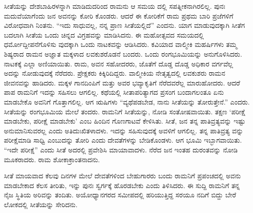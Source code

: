 ಸೀತೆಯನ್ನು ದೇಶಬಾಹಿರಳನ್ನಾಗಿ ಮಾಡಿದುದರಿಂದ ರಾಮನು ಆ ಸಮಯ ದಲ್ಲಿ ಸಪತ್ನೀಕನಾಗಿರಲಿಲ್ಲ. ಪುನಃ ಮದುವೆಯಾಗೆಂದು ಜನ ಅವನನ್ನು ಕೋರಿ ಕೊಂಡರು. ಆದರೆ ಈ ಕೋರಿಕೆಗೆ ರಾಮ ಪ್ರಥಮ ಬಾರಿ ಪ್ರಜೆಗಳಿಗೆ ವಿರೋಧವಾಗಿ ನಿಂತನು. “ಇದು ಸಾಧುವಲ್ಲ, ನನ್ನ ಪ್ರಾಣ ಸೀತೆಯಲ್ಲಿದೆ” ಎಂದನು. ಯಾಗ ಮಾಡುವುದಕ್ಕಾಗಿ ಸೀತೆಗ ಬದಲಾಗಿ ಸೀತೆಯ ಒಂದು ಚಿನ್ನದ ವಿಗ್ರಹವನ್ನು ಮಾಡಿಸಿದನು. ಈ ಮಹೋತ್ಸವದ ಸಮಯದಲ್ಲಿ ಧರ್ಮೋದ್ದೀಪನೆಗೊಳಿಸು ವುದಕ್ಕಾಗಿ ಒಂದು ನಾಟಕವನ್ನು ಆಡಿಸಿದರು. ಕವಿಯಾದ ವಾಲ್ಮೀಕಿ ಮಹರ್ಷಿಗಳು ತಮ್ಮ ಶಿಷ್ಯರಾದ ರಾಮನ ಅಜ್ಞಾತ ಮಕ್ಕಳಾದ ಲವಕುಶರೊಡನೆ ಬಂದರು. ಒಂದು ರಂಗಭೂಮಿಯನ್ನು ಅನುಗೊಳಿಸಿದರು. ನಾಟಕಕ್ಕೆ ಎಲ್ಲಾ ಅಣಿಯಾಯಿತು. ರಾಮ, ಅವನ ಸಹೋದರರು, ಜೊತೆಗೆ ದೊಡ್ಡ ದೊಡ್ಡ ಅಧಿಕಾರ ವರ್ಗವೆಲ್ಲ ಅದನ್ನು ನೋಡುವುದಕ್ಕೆ ನೆರೆದರು. ಪ್ರೇಕ್ಷಕರು ಕಿಕ್ಕಿರಿದಿದ್ದರು. ವಾಲ್ಮೀಕಿಯ ನೇತೃತ್ವದಲ್ಲಿ ಲವಕುಶರು ರಾಮನ ಜೀವನವನ್ನು ಹಾಡಿದರು. ಮಕ್ಕಳ ಗಾನದಿಂಪಿಗೆ ಮತ್ತು ಅವರ ಭವ್ಯಾಕೃತಿಗೆ ನೆರೆದವರೆಲ್ಲ ಮಾರುಹೋದರು. ಆದರೆ ಪಾಪ ರಾಮನಿಗೆ ಇದನ್ನು ಸಹಿಸಲು ಆಗಲಿಲ್ಲ. ಕಥೆಯಲ್ಲಿ ಸೀತಾಪರಿತ್ಯಾಗದ ಪ್ರಸಂಗ ಬಂದಾಗಲಂತೂ ಏನು ಮಾಡಬೇಕೊ ಅವನಿಗೆ ಗೊತ್ತಾಗಲಿಲ್ಲ. ಆಗ ಋಷಿಗಳು “ವ್ಯಥೆಪಡಬೇಡ, ನಾನು ಸೀತೆಯನ್ನು ತೋರುತ್ತೇನೆ.” ಎಂದರು. ಸೀತೆಯನ್ನು ರಂಗಭೂಮಿಯ ಮೇಲೆ ತಂದರು. ರಾಮನಿಗೆ ಸೀತೆಯನ್ನು, ನೋಡಿ ಸಂತೋಷವಾಯಿತು. ತಕ್ಷಣ ‘ಪರೀಕ್ಷೆ ಮಾಡಬೇಕು, ಪರೀಕ್ಷೆ ಮಾಡಬೇಕು’ ಎಂಬ ಹಿಂದಿನ ಗೊಣಗಾಟವೆ ಕೇಳಿಸಿತು. ಸೀತೆ, ಜನ ತನ್ನ ಪಾತಿವ್ರತ್ಯವನ್ನು ಇಷ್ಟು ಅನುಮಾನಿಸುವರಲ್ಲ ಎಂದು ಅತಿದುಃಖಿತಳಾದಳು. ಇದನ್ನು ಸಹಿಸುವುದಕ್ಕೆ ಅವಳಿಗೆ ಆಗಲಿಲ್ಲ. ತನ್ನ ಪಾತಿವ್ರತ್ಯ ವನ್ನು ಪರೀಕ್ಷೆಮಾಡಿ ಸಾಧ್ವಿ ಎಂಬುದನ್ನು ತೋರಿ ಎಂದು ದೇವತೆಗಳನ್ನು ಬೇಡಿಕೊಂಡಳು. ಆಗ ಭೂಮಿ ಇಬ್ಭಾಗವಾಯಿತು. “ಇದೇ ಪರೀಕ್ಷೆ” ಎಂದು ಸೀತೆ ಅದರಲ್ಲಿ ಪ್ರವೇಶಿಸಿ ಮಾಯಾವಾದಳು. ನೆರೆದ ಜನ ಇಂತಹ ದುರಂತವನ್ನು ನೋಡಿ ಮೂಕರಾದರು. ರಾಮ ಶೋಕಾಕ್ರಾಂತನಾದನು.

ಸೀತೆ ಮಾಯವಾದ ಕೆಲವು ದಿನಗಳ ಮೇಲೆ ದೇವತೆಗಳಿಂದ ಬೇಹುಗಾರರು ಬಂದು ರಾಮನಿಗೆ ಪ್ರಪಂಚದಲ್ಲಿ ಅವನು ಮಾಡಬೇಕಾದ ಕೆಲಸ ತೀರಿತು, ಇನ್ನು ಪುನಃ ಸ್ವರ್ಗಕ್ಕೆ ಹೊರಡಬೇಕು ಎಂದು ತಿಳಿಸಿದರು. ಈ ಸುದ್ದಿ ರಾಮನಿಗೆ ತನ್ನ ನೈಜ ಸ್ಥಿತಿಯ ಅರಿವನ್ನು ತಂದಿತು. ಅಯೋಧ್ಯಾನಗರದ ಸಮೀಪದಲ್ಲಿ ಹರಿಯುತ್ತಿದ್ದ ಸರಯೂ ನದಿಗೆ ಬಿದ್ದು ಬೇರೆ ಲೋಕದಲ್ಲಿ ಸೀತೆಯನ್ನು ಸೇರಿದನು.


